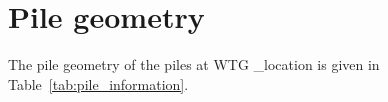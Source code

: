 


\chapter{Pile geometry}\label{sec_1}
The pile geometry of the piles at WTG \ID_location is given in Table~\ref{tab:pile_information}.

%  



